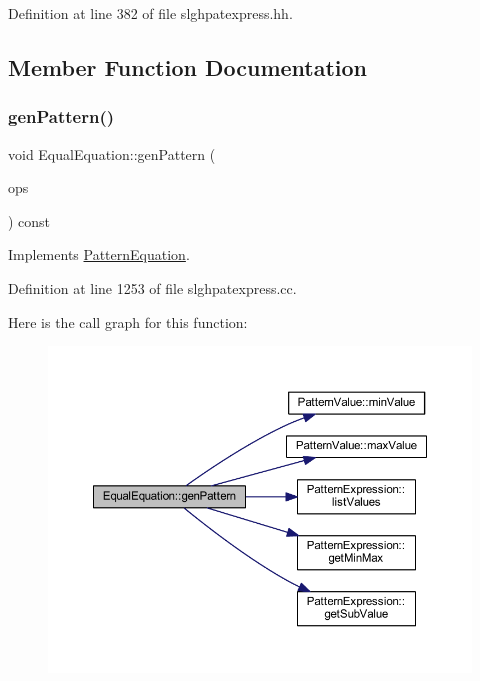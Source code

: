 Definition at line 382 of file slghpatexpress.\+hh.



\subsection{Member Function Documentation}
\mbox{\label{class_equal_equation_a39dc966c60f2cf4fa28753e3057536a0}} 
\subsubsection{\texorpdfstring{genPattern()}{genPattern()}}
{\footnotesize\ttfamily void Equal\+Equation\+::gen\+Pattern (\begin{DoxyParamCaption}\item[{const vector$<$ \mbox{\hyperlink{class_token_pattern}{Token\+Pattern}} $>$ \&}]{ops }\end{DoxyParamCaption}) const\hspace{0.3cm}{\ttfamily [virtual]}}



Implements \mbox{\hyperlink{class_pattern_equation_a9838e5bfe5b6013c99567628a6364bfd}{Pattern\+Equation}}.



Definition at line 1253 of file slghpatexpress.\+cc.

Here is the call graph for this function\+:
\nopagebreak
\begin{figure}[H]
\begin{center}
\leavevmode
\includegraphics[width=350pt]{class_equal_equation_a39dc966c60f2cf4fa28753e3057536a0_cgraph}
\end{center}
\end{figure}


